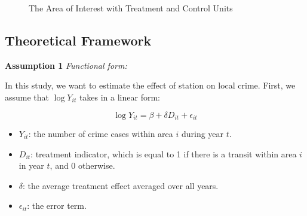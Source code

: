 \documentclass[a4paper, 11pt]{article}
\begin{document}
\begin{figure}
\hfill\hfill
\caption{The Area of Interest with Treatment and Control Units}
\label{fig:station_samples}
\end{figure}

\subsection{Theoretical Framework}

\textbf{Assumption 1 } \textit{Functional form:}

In this study, we want to estimate the effect of station on local crime. First, we assume that $\log Y_{it}$ takes in a linear form:

\[\log Y_{it}=\beta + \delta D_{it} + \epsilon_{it} \]

\begin{itemize}
    \item $Y_{it}$: the number of crime cases within area $i$ during year $t$.
    \item $D_{it}$: treatment indicator, which is equal to 1 if there is a transit within area $i$ in year $t$, and 0 otherwise.
    \item $\delta$: the average treatment effect averaged over all years.
    \item $\epsilon_{it}$: the error term.
\end{itemize}
\end{document}
